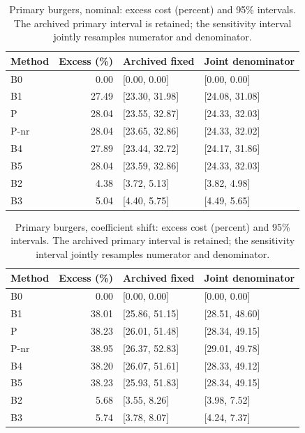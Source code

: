 \begin{table}[ht]
\caption{Primary burgers, nominal: excess cost (percent) and 95\% intervals. The archived primary interval is retained; the sensitivity interval jointly resamples numerator and denominator.}\label{tab:joint_burgers_locked_nominal}
\centering\small
\begin{tabular}{@{}lrll@{}}\toprule
Method & Excess (\%) & Archived fixed & Joint denominator\\\midrule
B0 & 0.00 & [0.00, 0.00] & [0.00, 0.00] \\
B1 & 27.49 & [23.30, 31.98] & [24.08, 31.08] \\
P & 28.04 & [23.55, 32.87] & [24.33, 32.03] \\
P-nr & 28.04 & [23.65, 32.86] & [24.33, 32.02] \\
B4 & 27.89 & [23.44, 32.72] & [24.17, 31.86] \\
B5 & 28.04 & [23.59, 32.86] & [24.33, 32.03] \\
B2 & 4.38 & [3.72, 5.13] & [3.82, 4.98] \\
B3 & 5.04 & [4.40, 5.75] & [4.49, 5.65] \\
\bottomrule\end{tabular}
\end{table}
\begin{table}[ht]
\caption{Primary burgers, coefficient shift: excess cost (percent) and 95\% intervals. The archived primary interval is retained; the sensitivity interval jointly resamples numerator and denominator.}\label{tab:joint_burgers_locked_coefficient_ood}
\centering\small
\begin{tabular}{@{}lrll@{}}\toprule
Method & Excess (\%) & Archived fixed & Joint denominator\\\midrule
B0 & 0.00 & [0.00, 0.00] & [0.00, 0.00] \\
B1 & 38.01 & [25.86, 51.15] & [28.51, 48.60] \\
P & 38.23 & [26.01, 51.48] & [28.34, 49.15] \\
P-nr & 38.95 & [26.37, 52.83] & [29.01, 49.78] \\
B4 & 38.20 & [26.07, 51.61] & [28.33, 49.12] \\
B5 & 38.23 & [25.93, 51.83] & [28.34, 49.15] \\
B2 & 5.68 & [3.55, 8.26] & [3.98, 7.52] \\
B3 & 5.74 & [3.78, 8.07] & [4.24, 7.37] \\
\bottomrule\end{tabular}
\end{table}
